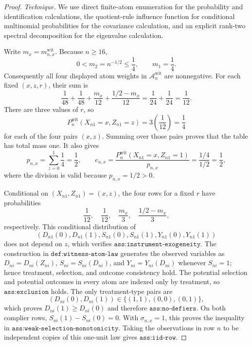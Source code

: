 \documentclass{article}
\begin{document}
\begin{proof}
\emph{Technique.} We use direct finite-atom enumeration for the probability and identification calculations, the quotient-rule influence function for conditional multinomial probabilities for the covariance calculation, and an explicit rank-two spectral decomposition for the eigenvalue calculation.

Write \(m_x=m^{\mathrm{wit}}_{n,x}\). Because \(n\geq16\),
\[
0<m_2=n^{-1/2}\leq\frac14,
\qquad
m_1=\frac14.
\]
Consequently all four displayed atom weights in \(\mathcal A_n^{\mathrm{wit}}\) are nonnegative. For each fixed \((x,z,r)\), their sum is
\[
\frac1{48}+\frac1{48}+\frac{m_x}{12}
+\frac{1/2-m_x}{12}
=\frac1{24}+\frac1{24}=\frac1{12}.
\]
There are three values of \(r\), so
\[
P_n^{\mathrm{wit}}(X_{n1}=x,Z_{n1}=z)=3\left(\frac1{12}\right)=\frac14
\]
for each of the four pairs \((x,z)\). Summing over those pairs proves that the table has total mass one. It also gives
\[
p_{n,x}=\sum_{z=0}^1\frac14=\frac12,
\qquad
e_{n,x}=\frac{P_n^{\mathrm{wit}}(X_{n1}=x,Z_{n1}=1)}{p_{n,x}}
=\frac{1/4}{1/2}=\frac12,
\]
where the division is valid because \(p_{n,x}=1/2>0\).

Conditional on \((X_{n1},Z_{n1})=(x,z)\), the four rows for a fixed \(r\) have probabilities
\[
\frac1{12},\quad \frac1{12},\quad
\frac{m_x}{3},\quad \frac{1/2-m_x}{3},
\]
respectively. This conditional distribution of
\[
(D_{n1}(0),D_{n1}(1),S_{n1}(0),S_{n1}(1),Y_{n1}(0),Y_{n1}(1))
\]
does not depend on \(z\), which verifies \(\texttt{ass:instrument-exogeneity}\). The construction in \(\texttt{def:witness-atom-law}\) generates the observed variables as \(D_{ni}=D_{ni}(Z_{ni})\), \(S_{ni}=S_{ni}(D_{ni})\), and \(Y_{ni}=Y_{ni}(D_{ni})\) whenever \(S_{ni}=1\); hence treatment, selection, and outcome consistency hold. The potential selection and potential outcomes in every atom are indexed only by treatment, so \(\texttt{ass:exclusion}\) holds. The only treatment-type pairs are
\[
(D_{ni}(0),D_{ni}(1))\in\{(1,1),(0,0),(0,1)\},
\]
which proves \(D_{ni}(1)\geq D_{ni}(0)\) and therefore \(\texttt{ass:no-defiers}\). On both complier rows, \(S_{ni}(1)-S_{ni}(0)=0\). With \(\sigma_{n,x}=1\), this proves the inequality in \(\texttt{ass:weak-selection-monotonicity}\). Taking the observations in row \(n\) to be independent copies of this one-unit law gives \(\texttt{ass:iid-row}\).


\end{proof}
\end{document}
